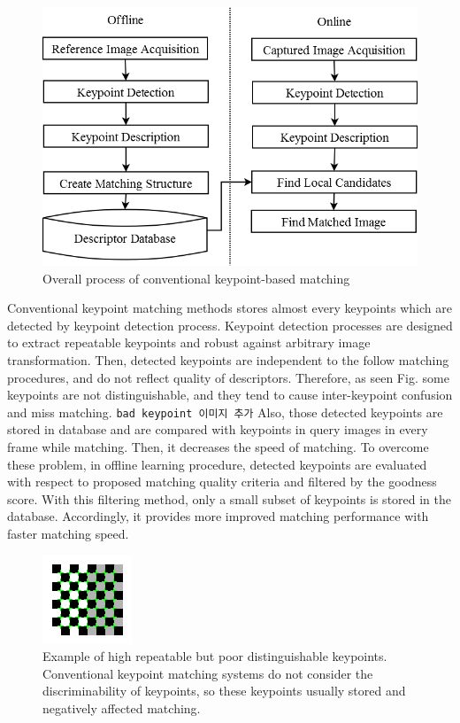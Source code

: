 \begin{figure}[hb!]
\centering
\includegraphics[width=1.0\columnwidth]{introduction/process}
\caption{Overall process of conventional keypoint-based matching}
\label{fig:on_offline_process}
\end{figure}

Conventional keypoint matching methods stores almost every keypoints which are detected by keypoint detection process. Keypoint detection processes are designed to extract repeatable keypoints and robust against arbitrary image transformation. Then, detected keypoints are independent to the follow matching procedures, and do not reflect quality of descriptors. Therefore, as seen Fig.  some keypoints are not distinguishable, and they tend to cause inter-keypoint confusion and miss matching. \texttt{bad keypoint 이미지 추가} Also, those detected keypoints are stored in database and are compared with keypoints in query images in every frame while matching. Then, it decreases the speed of matching. To overcome these problem, in offline learning procedure, detected keypoints are evaluated with respect to proposed matching quality criteria and filtered by the goodness score. With this filtering method, only a small subset of keypoints is stored in the database. Accordingly, it provides more improved matching performance with faster matching speed.

\begin{figure}[ht!]
\centering
\includegraphics[width=0.5\columnwidth]{introduction/checkerboard}
\caption{Example of high repeatable but poor distinguishable keypoints. Conventional keypoint matching systems do not consider the discriminability of keypoints, so these keypoints usually stored and negatively affected matching.}
\label{fig:example_of_bad_features}
\end{figure}